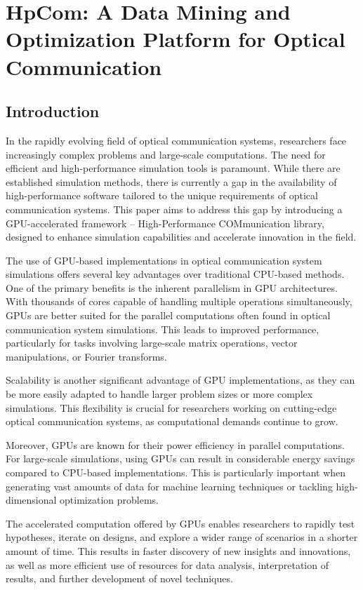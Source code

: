 \chapter{HpCom: A Data Mining and Optimization Platform for Optical Communication}

\section{Introduction}
In the rapidly evolving field of optical communication systems, researchers face increasingly complex problems and large-scale computations. The need for efficient and high-performance simulation tools is paramount. While there are established simulation methods, there is currently a gap in the availability of high-performance software tailored to the unique requirements of optical communication systems. This paper aims to address this gap by introducing a GPU-accelerated framework -- High-Performance COMmunication library\cite{esf0_2023_7880552}, designed to enhance simulation capabilities and accelerate innovation in the field.

The use of GPU-based implementations in optical communication system simulations offers several key advantages over traditional CPU-based methods\cite{brehler2017gpu}. One of the primary benefits is the inherent parallelism in GPU architectures. With thousands of cores capable of handling multiple operations simultaneously, GPUs are better suited for the parallel computations often found in optical communication system simulations. This leads to improved performance, particularly for tasks involving large-scale matrix operations, vector manipulations, or Fourier transforms.

Scalability is another significant advantage of GPU implementations, as they can be more easily adapted to handle larger problem sizes or more complex simulations. This flexibility is crucial for researchers working on cutting-edge optical communication systems, as computational demands continue to grow.

Moreover, GPUs are known for their power efficiency in parallel computations. For large-scale simulations, using GPUs can result in considerable energy savings compared to CPU-based implementations. This is particularly important when generating vast amounts of data for machine learning techniques or tackling high-dimensional optimization problems\cite{srivallapanondh2022knowledge, genty2021machine, reznichenko2022optimal}.

The accelerated computation offered by GPUs enables researchers to rapidly test hypotheses\cite{winzer2012optical}, iterate on designs, and explore a wider range of scenarios in a shorter amount of time. This results in faster discovery of new insights and innovations, as well as more efficient use of resources for data analysis, interpretation of results, and further development of novel techniques.

